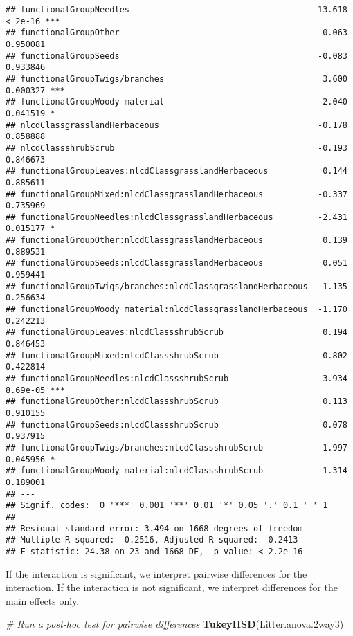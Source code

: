 \documentclass[
]{article}
\newenvironment{Shaded}{\begin{snugshade}}{\end{snugshade}}
\newcommand{\CommentTok}[1]{\textcolor[rgb]{0.56,0.35,0.01}{\textit{#1}}}
\newcommand{\FloatTok}[1]{\textcolor[rgb]{0.00,0.00,0.81}{#1}}
\newcommand{\KeywordTok}[1]{\textcolor[rgb]{0.13,0.29,0.53}{\textbf{#1}}}
\newcommand{\NormalTok}[1]{#1}
\begin{document}
\begin{verbatim}
## functionalGroupNeedles                                      13.618  < 2e-16 ***
## functionalGroupOther                                        -0.063 0.950081    
## functionalGroupSeeds                                        -0.083 0.933846    
## functionalGroupTwigs/branches                                3.600 0.000327 ***
## functionalGroupWoody material                                2.040 0.041519 *  
## nlcdClassgrasslandHerbaceous                                -0.178 0.858888    
## nlcdClassshrubScrub                                         -0.193 0.846673    
## functionalGroupLeaves:nlcdClassgrasslandHerbaceous           0.144 0.885611    
## functionalGroupMixed:nlcdClassgrasslandHerbaceous           -0.337 0.735969    
## functionalGroupNeedles:nlcdClassgrasslandHerbaceous         -2.431 0.015177 *  
## functionalGroupOther:nlcdClassgrasslandHerbaceous            0.139 0.889531    
## functionalGroupSeeds:nlcdClassgrasslandHerbaceous            0.051 0.959441    
## functionalGroupTwigs/branches:nlcdClassgrasslandHerbaceous  -1.135 0.256634    
## functionalGroupWoody material:nlcdClassgrasslandHerbaceous  -1.170 0.242213    
## functionalGroupLeaves:nlcdClassshrubScrub                    0.194 0.846453    
## functionalGroupMixed:nlcdClassshrubScrub                     0.802 0.422814    
## functionalGroupNeedles:nlcdClassshrubScrub                  -3.934 8.69e-05 ***
## functionalGroupOther:nlcdClassshrubScrub                     0.113 0.910155    
## functionalGroupSeeds:nlcdClassshrubScrub                     0.078 0.937915    
## functionalGroupTwigs/branches:nlcdClassshrubScrub           -1.997 0.045956 *  
## functionalGroupWoody material:nlcdClassshrubScrub           -1.314 0.189001    
## ---
## Signif. codes:  0 '***' 0.001 '**' 0.01 '*' 0.05 '.' 0.1 ' ' 1
## 
## Residual standard error: 3.494 on 1668 degrees of freedom
## Multiple R-squared:  0.2516, Adjusted R-squared:  0.2413 
## F-statistic: 24.38 on 23 and 1668 DF,  p-value: < 2.2e-16
\end{verbatim}

If the interaction is significant, we interpret pairwise differences for
the interaction. If the interaction is not significant, we interpret
differences for the main effects only.

\begin{Shaded}
\begin{Highlighting}[]
\CommentTok{# Run a post-hoc test for pairwise differences}
\KeywordTok{TukeyHSD}\NormalTok{(Litter.anova}\FloatTok{.2}\NormalTok{way3)}
\end{Highlighting}
\end{Shaded}
\end{document}
